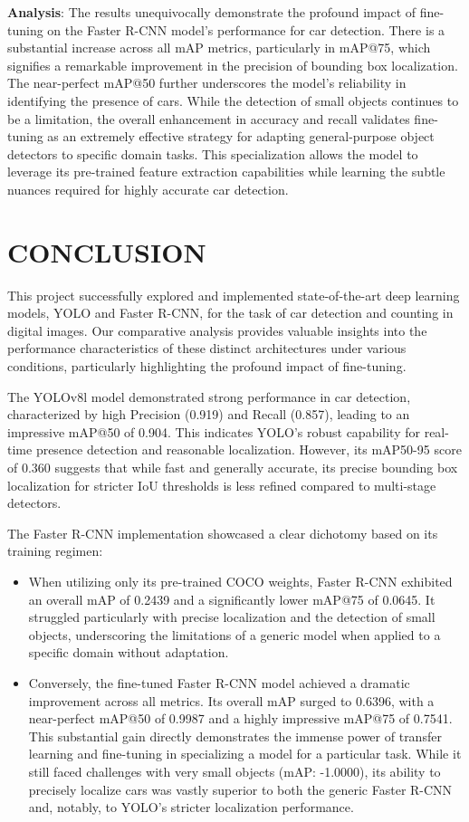 \documentclass[conference]{IEEEtran}
\begin{document}
\textbf{Analysis}: The results unequivocally demonstrate the profound impact of fine-tuning on the Faster R-CNN model's performance for car detection. There is a substantial increase across all mAP metrics, particularly in mAP@75, which signifies a remarkable improvement in the precision of bounding box localization. The near-perfect mAP@50 further underscores the model's reliability in identifying the presence of cars. While the detection of small objects continues to be a limitation, the overall enhancement in accuracy and recall validates fine-tuning as an extremely effective strategy for adapting general-purpose object detectors to specific domain tasks. This specialization allows the model to leverage its pre-trained feature extraction capabilities while learning the subtle nuances required for highly accurate car detection.

\section{\uppercase{Conclusion}} 
\label{sec:conclusion}

This project successfully explored and implemented state-of-the-art deep learning models, YOLO and Faster R-CNN, for the task of car detection and counting in digital images. Our comparative analysis provides valuable insights into the performance characteristics of these distinct architectures under various conditions, particularly highlighting the profound impact of fine-tuning.

The YOLOv8l model demonstrated strong performance in car detection, characterized by high Precision (0.919) and Recall (0.857), leading to an impressive mAP@50 of 0.904. This indicates YOLO's robust capability for real-time presence detection and reasonable localization. However, its mAP50-95 score of 0.360 suggests that while fast and generally accurate, its precise bounding box localization for stricter IoU thresholds is less refined compared to multi-stage detectors.

The Faster R-CNN implementation showcased a clear dichotomy based on its training regimen:
\begin{itemize}
    \item When utilizing only its pre-trained COCO weights, Faster R-CNN exhibited an overall mAP of 0.2439 and a significantly lower mAP@75 of 0.0645. It struggled particularly with precise localization and the detection of small objects, underscoring the limitations of a generic model when applied to a specific domain without adaptation.
    \item Conversely, the fine-tuned Faster R-CNN model achieved a dramatic improvement across all metrics. Its overall mAP surged to 0.6396, with a near-perfect mAP@50 of 0.9987 and a highly impressive mAP@75 of 0.7541. This substantial gain directly demonstrates the immense power of transfer learning and fine-tuning in specializing a model for a particular task. While it still faced challenges with very small objects (mAP: -1.0000), its ability to precisely localize cars was vastly superior to both the generic Faster R-CNN and, notably, to YOLO's stricter localization performance.
\end{itemize}
\end{document}
